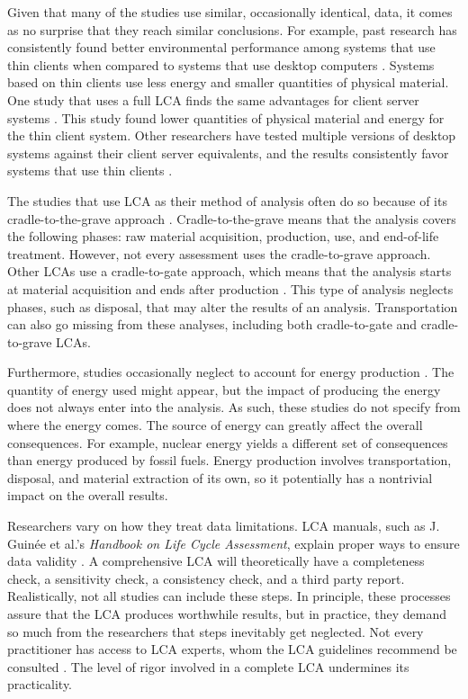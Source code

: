 \documentclass[final,journal,10pt,letterpaper,oneside,twocolumn,compsoc]%
{IEEEtran}
\begin{document}
Given that many of the studies use similar, occasionally identical, data, it
comes as no surprise
that they reach similar conclusions. For example, past research has consistently
found better environmental performance among systems that use thin clients when
compared to systems that use desktop computers \cite{maga} \cite{desktop2}.
Systems based on thin clients use less energy and smaller quantities of physical
material. One study that uses a full LCA finds
the same advantages for client server systems \cite{maga}. This study found
lower quantities of physical material and energy for the thin client system.
Other researchers have tested multiple versions of desktop systems against
their client server equivalents, and the results consistently favor
systems that use thin clients \cite{client}.

The studies that use LCA as their method of analysis often do so because of its
cradle-to-the-grave approach \cite{14044}. Cradle-to-the-grave means that the
analysis covers the following phases: raw material acquisition, production, use,
and end-of-life treatment. However, not every assessment uses the
cradle-to-grave approach. Other LCAs use a cradle-to-gate approach, which means
that the
analysis starts at material acquisition and ends after production \cite{14040}.
This type of analysis neglects phases, such as disposal, that may alter the
results of an analysis. Transportation can also go missing from these analyses,
including both cradle-to-gate and cradle-to-grave LCAs.

Furthermore, studies occasionally neglect to account for energy production
\cite{maga}
\cite{client} \cite{desktop}. The quantity of energy used might appear, but
the impact of producing the energy does not always enter into the analysis.
As such, these studies do not specify from where the energy comes. The source of
energy can
greatly affect the overall consequences. For example, nuclear energy yields a
different set
of consequences than energy produced by fossil fuels. Energy production involves
transportation,
disposal, and material extraction of its own, so it
potentially has a nontrivial impact on the overall results.

Researchers vary on how they treat data limitations. LCA manuals, such as J.
Guin\'{e}e et al.'s \textit{Handbook on Life Cycle Assessment}, explain
proper ways to ensure data validity \cite{lca} \cite{textbook}
\cite{14040} \cite{14044}. A comprehensive LCA will theoretically have a
completeness check, a sensitivity check, a consistency check, and a third party
report. Realistically, not all studies can include these steps. In
principle, these processes assure that the LCA produces worthwhile
results, but in practice, they demand so much from the researchers that
steps inevitably get neglected. Not every practitioner has access
to LCA experts, whom the LCA guidelines recommend be
consulted \cite{14044}. The level of rigor involved in a complete LCA
undermines its practicality.
\end{document}
